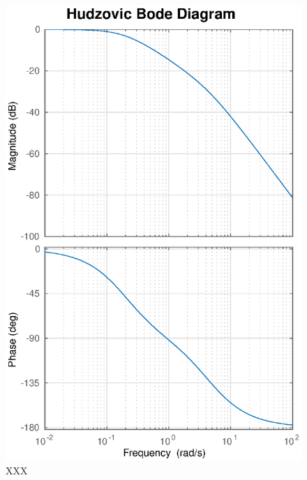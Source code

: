\begin{figure}[t]
    \centering
    \includegraphics[width=\linewidth]{images/hudzovic_bode}
    \caption{XXX}
\end{figure}

